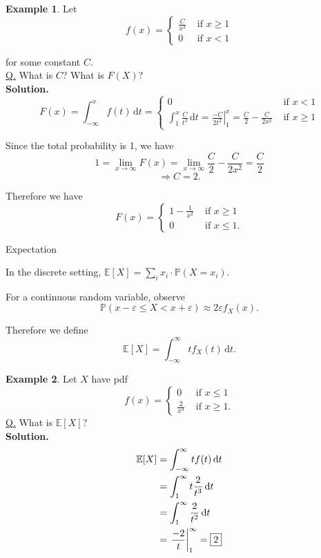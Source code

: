 \documentclass[a4paper,11pt]{amsbook}
\makeatletter
\def\section{\@startsection{section}{2}%
    \z@{1\linespacing\@plus1\linespacing}{.5\linespacing}%
    {\large\normalfont\bfseries\centering\color{darkblue}}}
\theoremstyle{definition}
\newtheorem{example}{\hspace{-2em} \color{darkblue} Example}[chapter]
\theoremstyle{remark}
\newcommand{\E}{\mathbb{E}}
\renewcommand{\P}{\mathbb{P}}
\newcommand\0{\varnothing}
\newcommand\dt[1][t]{\,\mathrm{d}#1}
\makeatother
\begin{document}
    \begin{example}
        Let $$f(x)=\begin{cases}
            \frac{C}{x^3} & \text{ if }x\geq1 \\[5pt]
            0 & \text{ if }x<1
        \end{cases}$$

        for some constant $C$.\\
        \underline{Q.} What is $C$? What is $F(X)$?\\
        \textbf{Solution.} $$F(x)=\int_{-\infty}^xf(t)\dt=\begin{cases}
            0 & \text{ if }x<1 \\[5pt]
            \int_1^x\frac{C}{t^3}\dt=\left.\frac{-C}{2t^2}\right|_1^x=\frac C2-\frac{C}{2x^2} & \text{ if }x\geq1
        \end{cases}$$

        Since the total probability is 1, we have
        $$1=\lim_{x\to\infty}F(x)=\lim_{x\to\infty}\frac C2-\frac{C}{2x^2}=\frac C2$$
        $$\Rightarrow C=2.$$

        Therefore we have
        $$F(x)=\begin{cases}
            1-\frac{1}{x^2} & \text{ if }x\geq1 \\
            0 & \text{ if }x\leq1.
        \end{cases}$$
    \end{example}
    
    \section{Expectation}

    In the discrete setting, $\E[X]=\sum_ix_i\cdot\P(X=x_i)$.
    
    For a continuous random variable, observe $$\P(x-\varepsilon\leq X<x+\varepsilon)\approx2\varepsilon f_X(x).$$

    Therefore we define 
    $$\E[X]=\int_{-\infty}^\infty tf_X(t)\dt.$$
    
    \begin{example}
        Let $X$ have pdf $$f(x)=\begin{cases}
            0 & \text{ if }x\leq1 \\
            \frac{2}{x^3} & \text{ if }x\geq1.
        \end{cases}$$
        \underline{Q.} What is $\E[X]$?\\
        \textbf{Solution.} \begin{align*}
            \E[X]&=\int_{-\infty}^{\infty} tf(t)\dt \\
            &=\int_1^\infty t\frac{2}{t^3}\dt \\
            &=\int_1^\infty \frac{2}{t^2}\dt \\
            &=\left.\frac{-2}{t}\right|_1^\infty=\fbox{2}
        \end{align*}
    \end{example}
\end{document}
